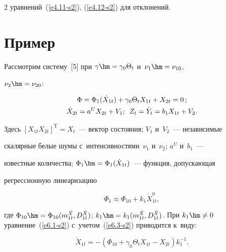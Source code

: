 \begin{multicols}{2}
уравнений~(\ref{e4.11-s2}), (\ref{e4.12-s2}) для отклонений.





\section{Пример}



Рассмотрим систему~[5] при $\gamma\hm=\gamma_0 \Theta_t$ и~$\nu_1\hm =\nu_{10}$, 

$\nu_2\hm = \nu_{20}$:

   \begin{gather}

   \Phi =\Phi_1 (\dot X_{1t}) + \gamma_0 \Theta_t X_{1t} + X_{2t} 

=0\,;\label{e6.1-s2}\\

\dot X_{2t} = a^U X_{2t} + V_1;\enskip Z_t=\dot Y_t = b_1 X_{1t} + 

V_2.\label{e6.2-s2}

\end{gather}

Здесь $[X_{1t} X_{2t}]^{\mathrm{T}}=X_t$~--- вектор состояния; $V_1$ и~$V_2$~--- независимые 

скалярные белые шумы с~интенсивностями~$\nu_1$ и~$\nu_2$; $a^U$ и~$b_1$~--- 

известные количества; $\Phi_1 \hm=\Phi_1 (\dot X_{1t})$~--- функция, допускающая 

регрессионную линеаризацию

   \begin{equation}

   \Phi_1 \approx \Phi_{10} + k_1 \dot X_{1t}^0,\label{e6.3-s2}

   \end{equation}

где $\Phi_{10} \hm=\Phi_{10} (m_{1t}^{\dot X}, D_{1t}^{\dot X})$; $k_1\hm= 

k_1(m_{1t}^{\dot X}, D_{1t}^{\dot X})$. При  $k_1\hm\ne 0$ уравнение~(\ref{e6.1-s2}) с~учетом~(\ref{e6.3-s2}) приводится к~виду:

   \begin{equation}

   \dot X_{1t} = -(\Phi_{10} + \gamma_0 \Theta_t  X_{1t} - X_{2t}) k_1^{-1}. 

\label{e6.4-s2}

\end{equation}


\end{multicols}
